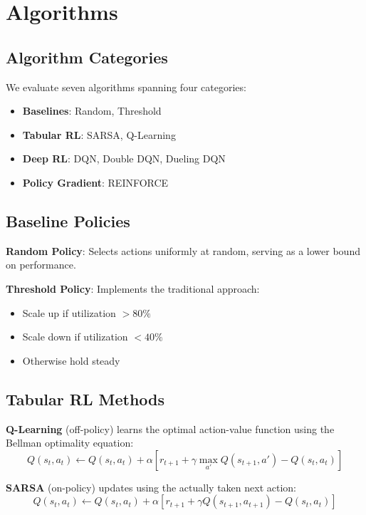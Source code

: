 \documentclass[conference]{IEEEtran}
\begin{document}
\section{Algorithms}

\subsection{Algorithm Categories}
We evaluate seven algorithms spanning four categories:
\begin{itemize}
    \item \textbf{Baselines}: Random, Threshold
    \item \textbf{Tabular RL}: SARSA, Q-Learning
    \item \textbf{Deep RL}: DQN, Double DQN, Dueling DQN
    \item \textbf{Policy Gradient}: REINFORCE
\end{itemize}

\subsection{Baseline Policies}
\textbf{Random Policy}: Selects actions uniformly at random, serving as a lower bound on performance.

\textbf{Threshold Policy}: Implements the traditional approach:
\begin{itemize}
    \item Scale up if utilization $> 80\%$
    \item Scale down if utilization $< 40\%$
    \item Otherwise hold steady
\end{itemize}

\subsection{Tabular RL Methods}

\textbf{Q-Learning} (off-policy) learns the optimal action-value function using the Bellman optimality equation:
\begin{equation}
Q(s_t, a_t) \leftarrow Q(s_t, a_t) + \alpha \left[ r_{t+1} + \gamma \max_{a'} Q(s_{t+1}, a') - Q(s_t, a_t) \right]
\end{equation}

\textbf{SARSA} (on-policy) updates using the actually taken next action:
\begin{equation}
Q(s_t, a_t) \leftarrow Q(s_t, a_t) + \alpha \left[ r_{t+1} + \gamma Q(s_{t+1}, a_{t+1}) - Q(s_t, a_t) \right]
\end{equation}
\end{document}
